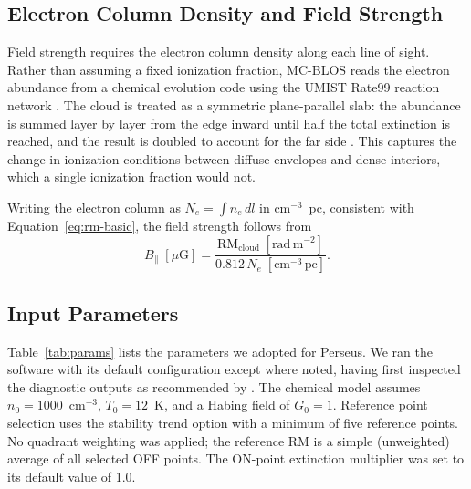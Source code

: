 \documentclass[twocolumn]{aastex701}
\begin{document}
  \subsection{Electron Column Density and Field Strength}
  \label{sec:ne}

  Field strength requires the electron column density along each line of sight.
  Rather than assuming a fixed ionization fraction, MC-BLOS reads the electron
  abundance from a chemical evolution code \citep{gibson2009} using the UMIST
  Rate99 reaction network \citep{leteuff2000}. The cloud is treated as a
  symmetric plane-parallel slab: the abundance is summed layer by layer from the
  edge inward until half the total extinction is reached, and the result is
  doubled to account for the far side \citep[see Figure~1
  of][]{tahani2025mcblos}. This captures the change in ionization conditions
  between diffuse envelopes and dense interiors, which a single ionization
  fraction would not.

  Writing the electron column as $N_e = \int n_e \, dl$ in
  cm$^{-3}$~pc, consistent with Equation~\ref{eq:rm-basic}, the field strength
  follows from
  \begin{equation}
  \label{eq:blos}
      B_\parallel \;[\mu\mathrm{G}] =
      \frac{\mathrm{RM_{cloud}} \;[\mathrm{rad\,m^{-2}}]}
           {0.812 \, N_e \;[\mathrm{cm^{-3}\,pc}]}.
  \end{equation}

  \subsection{Input Parameters}

  Table~\ref{tab:params} lists the parameters we adopted for Perseus. We ran the
  software with its default configuration except where noted, having first
  inspected the diagnostic outputs as recommended by \citet{tahani2025mcblos}. The chemical
  model assumes $n_0 = 1000$~cm$^{-3}$, $T_0 = 12$~K, and a Habing field of
  $G_0 = 1$. Reference point selection uses the stability trend option with a
  minimum of five reference points. No quadrant weighting was applied; the
  reference RM is a simple (unweighted) average of all selected OFF points. The
  ON-point extinction multiplier was set to its default value of 1.0.
\end{document}
